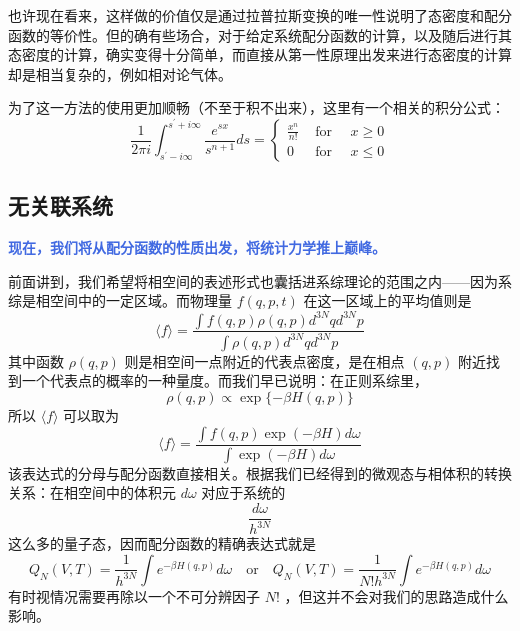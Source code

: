 也许现在看来，这样做的价值仅是通过拉普拉斯变换的唯一性说明了态密度和配分函数的等价性。但的确有些场合，对于给定系统配分函数的计算，以及随后进行其态密度的计算，确实变得十分简单，而直接从第一性原理出发来进行态密度的计算却是相当复杂的，例如相对论气体。

为了这一方法的使用更加顺畅（不至于积不出来），这里有一个相关的积分公式：
\begin{equation}\label{equ:Laplace}
    \frac{1}{2 \pi i} \int_{s^{\prime}-i \infty}^{s^{\prime}+i \infty} \frac{e^{s x}}{s^{n+1}} d s=\left\{\begin{array}{lll}
        \frac{x^n}{n !} & \text { for } \quad x \geq 0 \\
        0 & \text { for } \quad x \leq 0
        \end{array}\right.
\end{equation}

\subsection{无关联系统}
\textcolor{RoyalBlue}{\textbf{\kaishu 现在，我们将从配分函数的性质出发，将统计力学推上巅峰。}}

前面讲到，我们希望将相空间的表述形式也囊括进系综理论的范围之内——因为系综是相空间中的一定区域。而物理量 $f(q,p,t)$ 在这一区域上的平均值则是
\begin{equation}
    \langle f\rangle=\frac{\displaystyle\int f(q, p) \rho(q, p) d^{3 N} q d^{3 N} p}{\displaystyle\int \rho(q, p) d^{3 N} q d^{3 N} p}
\end{equation}
其中函数 $\rho(q,p)$ 则是相空间一点附近的代表点密度，是在相点 $(q,p)$ 附近找到一个代表点的概率的一种量度。而我们早已说明：在正则系综里，
\begin{equation}
    \rho(q, p) \propto \exp \{-\beta H(q, p)\}
\end{equation}
所以 $\langle f \rangle$ 可以取为
\begin{equation}
    \langle f\rangle=\frac{\displaystyle\int f(q, p) \exp (-\beta H) d \omega}{\displaystyle\int \exp (-\beta H) d \omega}
\end{equation}
该表达式的分母与配分函数直接相关。根据我们已经得到的微观态与相体积的转换关系：在相空间中的体积元 $d\omega$ 对应于系统的
\[
    \frac{d\omega}{h^{3N}} 
\]
这么多的量子态，因而配分函数的精确表达式就是
\begin{equation}\label{equ:phaseintegrate}
    Q_N(V, T)=\frac{1}{ h^{3 N}} \int e^{-\beta H(q, p)} d \omega\quad\text{or}\quad Q_N(V, T)=\frac{1}{N! h^{3 N}} \int e^{-\beta H(q, p)} d \omega
\end{equation}
有时视情况需要再除以一个不可分辨因子 $N!$ ，但这并不会对我们的思路造成什么影响。

